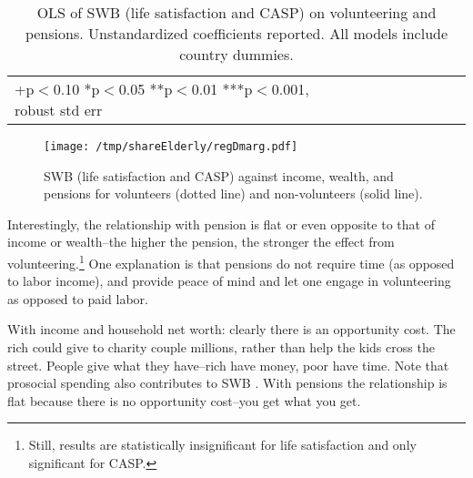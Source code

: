 \documentclass[10pt, letterpaper]{article}
\begin{document}
\begin{spacing}{1.4}
\begin{spacing}{.9}
\begin{table}[H]\centering \caption{OLS of SWB  (life satisfaction and CASP) on
    volunteering and pensions.  Unstandardized coefficients reported. All models
    include country dummies.}  \begin{scriptsize} \begin{tabular}{p{1.8in}p{.5in}p{.5in}p{.5in}|p{.5in}|p{.5in}p{.5in}p{.5in}p{.5in}p{.5in}p{.4in}p{.5in}p{.4in}}\hline 
      \hline\multicolumn{5}{l}{+p$<$0.10 *p$<$0.05 **p$<$0.01 ***p$<$0.001,
        robust std err} \end{tabular}\label{regDw6} \end{scriptsize}\end{table}
\end{spacing}


\begin{figure}[h!]
  \centering
\texttt{[image: /tmp/shareElderly/regDmarg.pdf]}  
  \caption{SWB  (life satisfaction and CASP) against income, wealth, and
    pensions for volunteers (dotted line) and non-volunteers (solid line).}
  \label{mar}
\end{figure}





Interestingly,  the
relationship with pension is flat or even opposite to that of income or wealth--the higher the
pension, the stronger the effect from volunteering.\footnote{Still, results are
statistically insignificant for life satisfaction and only significant for CASP.} One explanation is that
pensions do not require time (as opposed to labor income), and provide peace of
mind and let one engage in volunteering as opposed to paid labor. 

With income and household net worth: clearly there is an opportunity cost. The rich could give to charity couple
millions, rather than help the kids cross the street. People give what they
have--rich have money, poor have time.  Note that prosocial spending also
contributes to SWB \citep{aknin13}.
%
With pensions the relationship is flat because there is no opportunity cost--you
get what you get.




\end{spacing}
\end{document}
